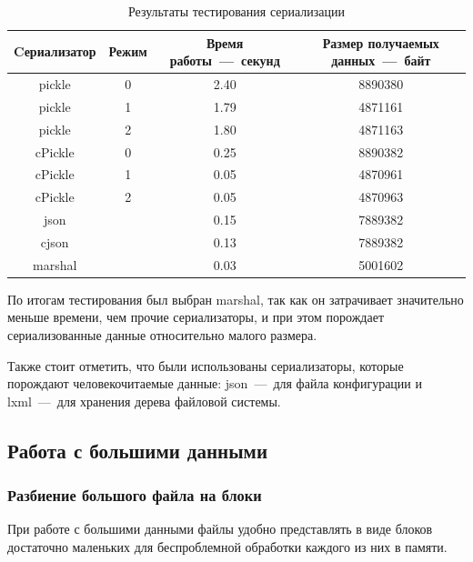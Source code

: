 \documentclass[12pt,a4paper,oneside]{extarticle}
\begin{document}
            \begin{table}[h!]
                \centering
                \begin{tabular}{|c|c|c|c|}
                    \hline
                    Cериализатор & Режим & Время работы~---~секунд  & Размер получаемых данных~---~байт \\
                    \hline
                    pickle & 0 & 2.40 & 8890380 \\
                    pickle & 1 & 1.79 & 4871161 \\
                    pickle & 2 & 1.80 & 4871163 \\
                    cPickle & 0 & 0.25 & 8890382 \\
                    cPickle & 1 & 0.05 & 4870961 \\
                    cPickle & 2 & 0.05 & 4870963 \\
                    json &  & 0.15 & 7889382 \\
                    cjson &  & 0.13 & 7889382 \\
                    marshal &  & 0.03 & 5001602 \\
                    \hline
                \end{tabular}
           
                \caption{Результаты тестирования сериализации}
                \label{table:serialize}
            \end{table}

            По итогам тестирования был выбран marshal, так как он затрачивает значительно меньше времени, чем прочие сериализаторы, и при этом порождает сериализованные данные относительно малого размера.

            Также стоит отметить, что были использованы сериализаторы, которые порождают человекочитаемые данные: json~---~для файла конфигурации и lxml~---~для хранения дерева файловой системы.
    \clearpage

    \subsection{Работа с большими данными}
        \subsubsection{Разбиение большого файла на блоки}
            При работе с большими данными файлы удобно представлять в виде блоков достаточно маленьких для беспроблемной обработки каждого из них в памяти.
\end{document}
